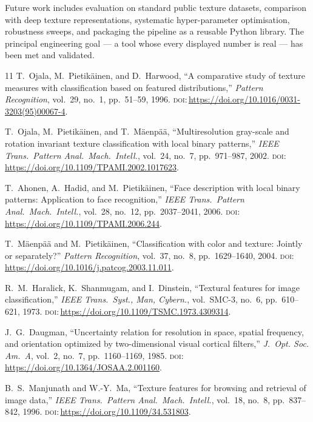 \documentclass[conference]{IEEEtran}
\providecommand{\doi}[1]{\textsc{doi}:\,\url{https://doi.org/#1}}
\begin{document}
Future work includes evaluation on standard public texture datasets,
comparison with deep texture representations, systematic hyper-parameter
optimisation, robustness sweeps, and packaging the pipeline as a reusable
Python library. The principal engineering goal --- a tool whose every
displayed number is real --- has been met and validated.

\begin{thebibliography}{11}
T.~Ojala, M.~Pietik\"{a}inen, and D.~Harwood, ``A comparative study of
texture measures with classification based on featured distributions,''
\emph{Pattern Recognition}, vol.~29, no.~1, pp.~51--59, 1996.
\doi{10.1016/0031-3203(95)00067-4}.

T.~Ojala, M.~Pietik\"{a}inen, and T.~M\"{a}enp\"{a}\"{a}, ``Multiresolution
gray-scale and rotation invariant texture classification with local binary
patterns,'' \emph{IEEE Trans.\ Pattern Anal.\ Mach.\ Intell.}, vol.~24,
no.~7, pp.~971--987, 2002. \doi{10.1109/TPAMI.2002.1017623}.

T.~Ahonen, A.~Hadid, and M.~Pietik\"{a}inen, ``Face description with local
binary patterns: Application to face recognition,'' \emph{IEEE Trans.\
Pattern Anal.\ Mach.\ Intell.}, vol.~28, no.~12, pp.~2037--2041, 2006.
\doi{10.1109/TPAMI.2006.244}.

T.~M\"{a}enp\"{a}\"{a} and M.~Pietik\"{a}inen, ``Classification with color
and texture: Jointly or separately?'' \emph{Pattern Recognition}, vol.~37,
no.~8, pp.~1629--1640, 2004. \doi{10.1016/j.patcog.2003.11.011}.

R.~M.~Haralick, K.~Shanmugam, and I.~Dinstein, ``Textural features for image
classification,'' \emph{IEEE Trans.\ Syst., Man, Cybern.}, vol.~SMC-3,
no.~6, pp.~610--621, 1973. \doi{10.1109/TSMC.1973.4309314}.

J.~G.~Daugman, ``Uncertainty relation for resolution in space, spatial
frequency, and orientation optimized by two-dimensional visual cortical
filters,'' \emph{J.~Opt. Soc. Am.~A}, vol.~2, no.~7, pp.~1160--1169, 1985.
\doi{10.1364/JOSAA.2.001160}.

B.~S.~Manjunath and W.-Y.~Ma, ``Texture features for browsing and retrieval
of image data,'' \emph{IEEE Trans.\ Pattern Anal.\ Mach.\ Intell.}, vol.~18,
no.~8, pp.~837--842, 1996. \doi{10.1109/34.531803}.


\end{thebibliography}
\end{document}
